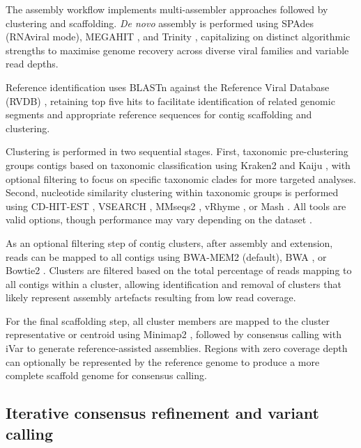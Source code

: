 The assembly workflow implements multi-assembler approaches followed by clustering and scaffolding. \textit{De novo} assembly is performed using SPAdes \citep{Meleshko2021-gb} (RNAviral mode), MEGAHIT \citep{Li2016-sd}, and Trinity \citep{Grabherr2011-ef}, capitalizing on distinct algorithmic strengths to maximise genome recovery across diverse viral families and variable read depths.

Reference identification uses BLASTn \citep{Altschul1990-sy} against the Reference Viral Database (RVDB) \citep{Goodacre2018-dw}, retaining top five hits to facilitate identification of related genomic segments and appropriate reference sequences for contig scaffolding and clustering.

Clustering is performed in two sequential stages. First, taxonomic pre-clustering groups contigs based on taxonomic classification using Kraken2 \citep{Wood2019-jl} and Kaiju \citep{Menzel2016-tz}, with optional filtering to focus on specific taxonomic clades for more targeted analyses. Second, nucleotide similarity clustering within taxonomic groups is performed using CD-HIT-EST \citep{Li2006-nj}, VSEARCH \citep{Rognes2016-ju}, MMseqs2 \citep{Steinegger2017-ci}, vRhyme \citep{Kieft2022-km}, or Mash \citep{Ondov2019-bo}. All tools are valid options, though performance may vary depending on the dataset \citep{Zielezinski2025-vl,Steinegger2017-ci}.

As an optional filtering step of contig clusters, after assembly and extension, reads can be mapped to all contigs using BWA-MEM2 \citep{Vasimuddin2019-rb} (default), BWA \citep{Li2013-pp}, or Bowtie2 \citep{Langmead2019-wx}. Clusters are filtered based on the total percentage of reads mapping to all contigs within a cluster, allowing identification and removal of clusters that likely represent assembly artefacts resulting from low read coverage.

For the final scaffolding step, all cluster members are mapped to the cluster representative or centroid using Minimap2 \citep{Li2018-gi}, followed by consensus calling with iVar \citep{Grubaugh2019-xd} to generate reference-assisted assemblies. Regions with zero coverage depth can optionally be represented by the reference genome to produce a more complete scaffold genome for consensus calling.

\subsection{Iterative consensus refinement and variant calling}

